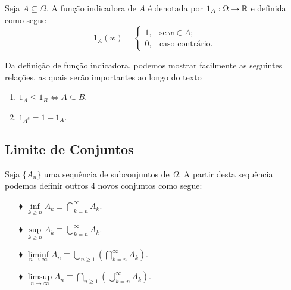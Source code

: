 \begin{definicao}\label{def-funcao-indicadora}
	Seja $A \subseteq \Omega$. 
	A função indicadora  
	de $A$ é denotada por $1_A: \Omega \to \mathbb{R}$ e definida 
	como segue
	\[
		1_A(w) =
			\begin{cases}
				1, & \text{se}\ w \in A; \\
				0, & \text{caso contrário.}
			\end{cases}
	\]
\end{definicao}








\begin{observacao} 
	Da definição de função indicadora, podemos mostrar facilmente 
	as seguintes relações,
	as quais serão importantes ao longo do texto
	\begin{enumerate}
		\item 
		$1_A \leqslant 1_B \Leftrightarrow A \subseteq B$.

		\item
		$1_{A^c}= 1- 1_A$.
\end{enumerate}
\end{observacao}







\subsection{Limite de Conjuntos}

Seja $\{A_n\}$ uma sequência de subconjuntos de $\Omega$.
A partir desta sequência podemos definir outros 4 novos conjuntos
como segue:
\begin{enumerate}
\item[$\blacklozenge$] 
	$\inf \limits_{k\geqslant n} A_k 
	\equiv 
	\displaystyle\bigcap_{k=n}^{\infty}{A_k}$.

\item[$\blacklozenge$] 
	$\sup \limits_{k\geqslant n} A_k 
	\equiv 
	\displaystyle\bigcup_{k=n}^{\infty}{A_k}$.

\item[$\blacklozenge$] 
	$\liminf \limits_{n \to \infty} A_n 
	\equiv 
	\displaystyle\bigcup_ {n\geqslant 1} 
		\left(\displaystyle\bigcap_{k=n}^{\infty}{A_k} \right)
	$.

\item[$\blacklozenge$] 
	$\limsup \limits_{n \to \infty} A_n 
	\equiv 
	\displaystyle\bigcap_ {n\geqslant 1} 
		\left(\displaystyle\bigcup_{k=n}^{\infty}{A_k} \right)
	$.
\end{enumerate}






